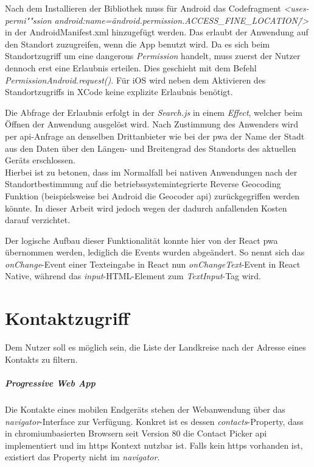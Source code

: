 Nach dem Installieren der Bibliothek muss für Android das Codefragment \textit{<uses-permi""ssion android:name=\"android.permission.ACCESS\_FINE\_LOCATION\"/>} in der AndroidManifest.xml hinzugefügt werden.
Das erlaubt der Anwendung auf den Standort zuzugreifen, wenn die App benutzt wird.
Da es sich beim Standortzugriff um eine \glqq dangerous\grqq{} \textit{Permission} handelt, muss zuerst der Nutzer dennoch erst eine Erlaubnis erteilen. 
Dies geschieht mit dem Befehl \textit{PermissionAndroid.request()}.
Für iOS wird neben dem Aktivieren des Standortzugriffs in XCode keine explizite Erlaubnis benötigt.

Die Abfrage der Erlaubnis erfolgt in der \textit{Search.js} in einem \textit{Effect}, welcher beim Öffnen der Anwendung ausgelöst wird.
Nach Zustimmung des Anwenders wird per \ac{api}-Anfrage an denselben Drittanbieter wie bei der \ac{pwa} der Name der Stadt aus den Daten über den Längen- und Breitengrad des Standorts des aktuellen Geräts erschlossen.\\
Hierbei ist zu betonen, dass im Normalfall bei nativen Anwendungen nach der Standortbestimmung auf die betriebssystemintegrierte Reverse Geocoding Funktion (beispielsweise bei Android die Geocoder \ac{api}) zurückgegriffen werden könnte.
In dieser Arbeit wird jedoch wegen der dadurch anfallenden Kosten darauf verzichtet.

Der logische Aufbau dieser Funktionalität konnte hier von der React \ac{pwa} übernommen werden, lediglich die Events wurden abgeändert.
So nennt sich das \textit{onChange}-Event einer Texteingabe in React nun \textit{onChangeText}-Event in React Native, während das \textit{input}-HTML-Element zum \textit{TextInput}-Tag wird.

\section{Kontaktzugriff}
Dem Nutzer soll es möglich sein, die Liste der Landkreise nach der Adresse eines Kontakts zu filtern.

\subparagraph{Progressive Web App\\}
Die Kontakte eines mobilen Endgeräts stehen der Webanwendung über das \textit{navigator}-Interface zur Verfügung.
Konkret ist es dessen \textit{contacts}-Property, dass in chromiumbasierten Browsern seit Version 80 die Contact Picker \ac{api} implementiert und im \ac{https} Kontext nutzbar ist.
Falls kein \ac{https} vorhanden ist, existiert das Property nicht im \textit{navigator}.


